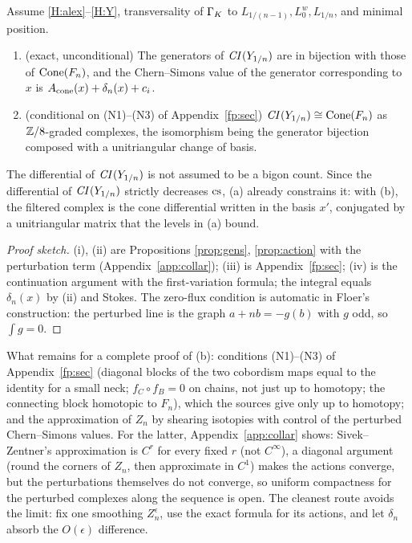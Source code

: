 \begin{theorem}\label{thm:exact-inst}
Assume \ref{H:alex}--\ref{H:Y}, transversality of $\Gamma_K$ to $L_{1/(n-1)},L^w_0,L_{1/n}$, and minimal position.
\begin{enumerate}[label=(\alph*)]
\item \textup{(exact, unconditional)} The generators of $\mathit{CI}(Y_{1/n})$ are in bijection with those of
$\operatorname{Cone}(F_n)$, and the Chern--Simons value of the generator corresponding to $x$ is $A_{\rm cone}(x)+\delta_n(x)+c_i$.
\item \textup{(conditional on (N1)--(N3) of Appendix~\ref{fp:sec})} $\mathit{CI}(Y_{1/n})\cong\operatorname{Cone}(F_n)$ as
$\mathbb{Z}/8$-graded complexes, the isomorphism being the generator bijection composed with a unitriangular change of
basis.
\end{enumerate}
The differential of $\mathit{CI}(Y_{1/n})$ is not assumed to be a bigon count.  Since the differential of $\mathit{CI}(Y_{1/n})$
strictly decreases $\mathrm{cs}$, (a) already constrains it: with (b), the filtered complex is the cone differential
written in the basis $x'$, conjugated by a unitriangular matrix that the levels in (a) bound.
\end{theorem}
\begin{proof}[Proof sketch]
(i), (ii) are Propositions \ref{prop:gens}, \ref{prop:action} with the perturbation term (Appendix~\ref{app:collar});
(iii) is Appendix~\ref{fp:sec}; (iv) is the continuation argument with the first-variation formula; the integral
equals $\delta_n(x)$ by (ii) and Stokes.  The zero-flux condition is automatic in Floer's construction: the
perturbed line is the graph $a+nb=-g(b)$ with $g$ odd, so $\int g=0$.
\end{proof}
What remains for a complete proof of (b): conditions (N1)--(N3) of Appendix~\ref{fp:sec} (diagonal blocks of the
two cobordism maps equal to the identity for a small neck; $f_C\circ f_B=0$ on chains, not just up to homotopy;
the connecting block homotopic to $F_n$), which the sources give only up to homotopy; and the approximation of $Z_n$ by
shearing isotopies with control of the perturbed Chern--Simons values.  For the latter, Appendix~\ref{app:collar}
shows: Sivek--Zentner's approximation is $C^r$ for every fixed $r$ (not $C^\infty$), a diagonal argument (round
the corners of $Z_n$, then approximate in $C^1$) makes the actions converge, but the perturbations themselves do
not converge, so uniform compactness for the perturbed complexes along the sequence is open.  The cleanest route
avoids the limit: fix one smoothing $Z_n^\epsilon$, use the exact formula for its actions, and let $\delta_n$ absorb the
$O(\epsilon)$ difference.
